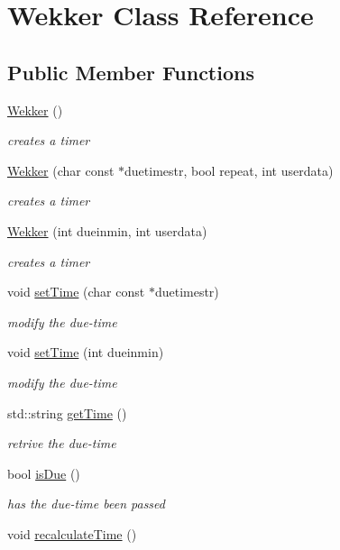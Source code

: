 \hypertarget{class_wekker}{}\section{Wekker Class Reference}
\label{class_wekker}
\subsection*{Public Member Functions}
\begin{DoxyCompactItemize}
\item 
\hypertarget{class_wekker_a6dfbdf69cc3f11a4b995ec3393a62507}{}\hyperlink{class_wekker_a6dfbdf69cc3f11a4b995ec3393a62507}{Wekker} ()\label{class_wekker_a6dfbdf69cc3f11a4b995ec3393a62507}

\begin{DoxyCompactList}\small\item\em creates a timer \end{DoxyCompactList}\item 
\hyperlink{class_wekker_a430abbc87ca880cddbf18b89c07aabe8}{Wekker} (char const $\ast$duetimestr, bool repeat, int userdata)
\begin{DoxyCompactList}\small\item\em creates a timer \end{DoxyCompactList}\item 
\hyperlink{class_wekker_a16083e8bda81545ec6abb84eb8a933e4}{Wekker} (int dueinmin, int userdata)
\begin{DoxyCompactList}\small\item\em creates a timer \end{DoxyCompactList}\item 
void \hyperlink{class_wekker_ad22f1f5fbd543892690cc94bd1b586f5}{set\+Time} (char const $\ast$duetimestr)
\begin{DoxyCompactList}\small\item\em modify the due-\/time \end{DoxyCompactList}\item 
void \hyperlink{class_wekker_a0a6ca8af43c1525e66ccfeace3da5d7b}{set\+Time} (int dueinmin)
\begin{DoxyCompactList}\small\item\em modify the due-\/time \end{DoxyCompactList}\item 
std\+::string \hyperlink{class_wekker_a1386592e7c4f638cfee0f922bb5e03ab}{get\+Time} ()
\begin{DoxyCompactList}\small\item\em retrive the due-\/time \end{DoxyCompactList}\item 
bool \hyperlink{class_wekker_a99ffd9a102d8c591749ac17aed52fb0f}{is\+Due} ()
\begin{DoxyCompactList}\small\item\em has the due-\/time been passed \end{DoxyCompactList}\item 
\hypertarget{class_wekker_abbafe0b0a3f660d85b30fb923707ed48}{}void \hyperlink{class_wekker_abbafe0b0a3f660d85b30fb923707ed48}{recalculate\+Time} ()\label{class_wekker_abbafe0b0a3f660d85b30fb923707ed48}


\end{DoxyCompactItemize}
